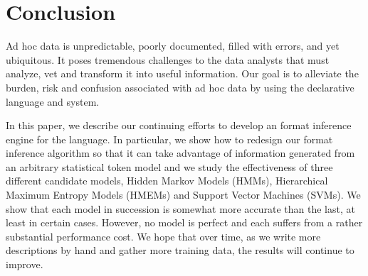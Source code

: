 \section{Conclusion}\label{sec:conclude}

Ad hoc data is unpredictable, poorly documented, filled with errors, 
and yet ubiquitous.  It poses tremendous challenges to the data analysts
that must analyze, vet and transform it into useful information.
Our goal is to alleviate the burden, risk and confusion associated 
with ad hoc data by using the declarative \pads{} language and system.

In this paper, we describe our 
continuing efforts to develop an format inference engine for 
the \pads{} language. In particular, 
we show how to redesign our format inference algorithm
so that it can take advantage of information 
generated from an arbitrary statistical token model and we
study the effectiveness of three different candidate models,
Hidden Markov Models (HMMs), Hierarchical Maximum Entropy Models
(HMEMs) and Support Vector Machines (SVMs).
We show that each model in succession is somewhat more
accurate than the last, at least in certain cases.  However, 
no model is perfect and each suffers from a rather substantial
performance cost.  We hope that over time, as we write more
\pads{} descriptions by hand and gather more training data, 
the results will continue to improve.
